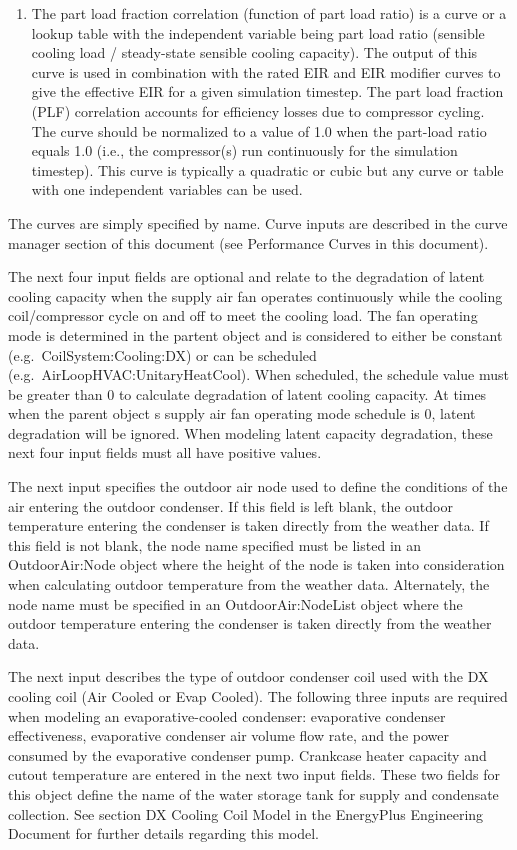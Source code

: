 \begin{enumerate}
\item
  The part load fraction correlation (function of part load ratio) is a curve or a lookup table with the independent variable being part load ratio (sensible cooling load / steady-state sensible cooling capacity). The output of this curve is used in combination with the rated EIR and EIR modifier curves to give the effective EIR for a given simulation timestep. The part load fraction (PLF) correlation accounts for efficiency losses due to compressor cycling. The curve should be normalized to a value of 1.0 when the part-load ratio equals 1.0 (i.e., the compressor(s) run continuously for the simulation timestep). This curve is typically a quadratic or cubic but any curve or table with one independent variables can be used.
\end{enumerate}

The curves are simply specified by name. Curve inputs are described in the curve manager section of this document (see Performance Curves in this document).

The next four input fields are optional and relate to the degradation of latent cooling capacity when the supply air fan operates continuously while the cooling coil/compressor cycle on and off to meet the cooling load. The fan operating mode is determined in the partent object and is considered to either be constant (e.g.~CoilSystem:Cooling:DX) or can be scheduled (e.g.~AirLoopHVAC:UnitaryHeatCool). When scheduled, the schedule value must be greater than 0 to calculate degradation of latent cooling capacity. At times when the parent object s supply air fan operating mode schedule is 0, latent degradation will be ignored. When modeling latent capacity degradation, these next four input fields must all have positive values.

The next input specifies the outdoor air node used to define the conditions of the air entering the outdoor condenser. If this field is left blank, the outdoor temperature entering the condenser is taken directly from the weather data. If this field is not blank, the node name specified must be listed in an OutdoorAir:Node object where the height of the node is taken into consideration when calculating outdoor temperature from the weather data. Alternately, the node name must be specified in an OutdoorAir:NodeList object where the outdoor temperature entering the condenser is taken directly from the weather data.

The next input describes the type of outdoor condenser coil used with the DX cooling coil (Air Cooled or Evap Cooled). The following three inputs are required when modeling an evaporative-cooled condenser: evaporative condenser effectiveness, evaporative condenser air volume flow rate, and the power consumed by the evaporative condenser pump. Crankcase heater capacity and cutout temperature are entered in the next two input fields. These two fields for this object define the name of the water storage tank for supply and condensate collection. See section DX Cooling Coil Model in the EnergyPlus Engineering Document for further details regarding this model.

